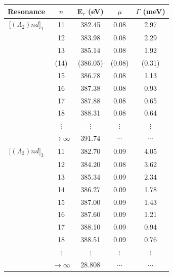 \begin{table}[hbt]
\footnotesize
\begin{center}
\begin{tabular}{@{} l c c c c @{}}
\toprule

\multicolumn{1}{c}{Resonance} & \multicolumn{1}{c}{$n$} & \multicolumn{1}{c}{E$_r$ (eV)} & \multicolumn{1}{c}{$\mu$} & \multicolumn{1}{c}{$\Gamma$ (meV)}  \\

\toprule
  \multicolumn{1}{c}{[$(\Lambda_2)nd]_{1}$} & 11 & 382.45 & 0.08 & 2.97 \\
  \multicolumn{1}{c}{} & 12 & 383.98 & 0.08 & 2.29  \\
  \multicolumn{1}{c}{} & 13 & 385.14 & 0.08 & 1.92  \\
  \multicolumn{1}{c}{} & (14) & (386.05) & (0.08) & (0.31)  \\
  \multicolumn{1}{c}{} & 15 & 386.78 & 0.08 & 1.13 \\
  \multicolumn{1}{c}{} & 16 & 387.38 & 0.08 & 0.93 \\
  \multicolumn{1}{c}{} & 17 & 387.88 & 0.08 & 0.65 \\
  \multicolumn{1}{c}{} & 18 & 388.31 & 0.08 & 0.64 \\
  \multicolumn{1}{c}{} & $\vdots$ & $\vdots$ & $\vdots$ & $\vdots$ \\
  \multicolumn{1}{c}{} & $\rightarrow \infty$ & 391.74 & $\cdots$ & $\cdots$ \\
                                     \midrule
   \multicolumn{1}{c}{[$(\Lambda_3)nd]_{3}$} & 11 & 382.70 & 0.09 & 4.05 \\
  \multicolumn{1}{c}{}  & 12 & 384.20 & 0.08 & 3.62 \\
  \multicolumn{1}{c}{}   & 13 & 385.34 & 0.09 & 2.34 \\
  \multicolumn{1}{c}{} & 14 & 386.27 & 0.09 & 1.78 \\
 \multicolumn{1}{c}{}  & 15 & 387.00 & 0.09 & 1.43 \\
 \multicolumn{1}{c}{}   & 16 & 387.60 & 0.09 & 1.21 \\
 \multicolumn{1}{c}{}  & 17 & 388.10 & 0.09 & 0.94 \\
 \multicolumn{1}{c}{}  & 18 & 388.51 & 0.09 & 0.76 \\
  \multicolumn{1}{c}{}  & $\vdots$ & $\vdots$ & $\vdots$ & $\vdots$ \\
  \multicolumn{1}{c}{}  & $\rightarrow \infty$ & 28.808 & $\cdots$ & $\cdots$ \\
                               \midrule

\end{tabular}
\end{center}
\end{table}
